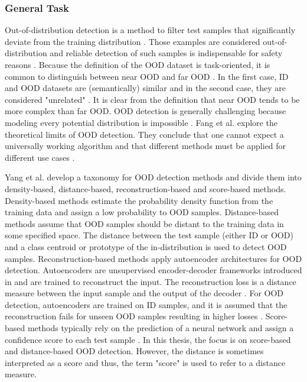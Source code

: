 \subsubsection{General Task}
Out-of-distribution detection is a method to filter test samples that significantly deviate from the training distribution \citep{Yang2021}.
Those examples are considered out-of-distribution and reliable detection of such samples is indispensable for safety reasons \citep{Yang2021}.
Because the definition of the OOD dataset is task-oriented, it is common to distinguish between near OOD and far OOD \citep{Winkens2020}.
In the first case, ID and OOD datasets are (semantically) similar and in the second case, they are considered "unrelated" \citep{Winkens2020}.
It is clear from the definition that near OOD tends to be more complex than far OOD.
OOD detection is generally challenging because modeling every potential distribution is impossible \citep{Salehi2022}.
Fang et al. \citep{Fang2023} explore the theoretical limits of OOD detection.
They conclude that one cannot expect a universally working algorithm and that different methods must be applied for different use cases \citep{Fang2023}.
\par
Yang et al. \citep{Yang2021} develop a taxonomy for OOD detection methods and divide them into density-based, distance-based, reconstruction-based and score-based methods.
Density-based methods estimate the probability density function from the training data and assign a low probability to OOD samples.
Distance-based methods assume that OOD samples should be distant to the training data in some specified space.
The distance between the test sample (either ID or OOD) and a class centroid or prototype of the in-distribution is used to detect OOD samples.
Reconstruction-based methods apply autoencoder architectures for OOD detection.
Autoencoders are unsupervised encoder-decoder frameworks introduced in \citep{Rumelhart1986} and are trained to reconstruct the input.
The reconstruction loss is a distance measure between the input sample and the output of the decoder \citep{Baldi2012, Bank2020}.
For OOD detection, autoencoders are trained on ID samples, and it is assumed that the reconstruction fails for unseen OOD samples resulting in higher losses \citep{Denouden2018}.
Score-based methods typically rely on the prediction of a neural network and assign a confidence score to each test sample \citep{Yang2021}.
In this thesis, the focus is on score-based and distance-based OOD detection.
However, the distance is sometimes interpreted as a score and thus, the term "score" is used to refer to a distance measure.
